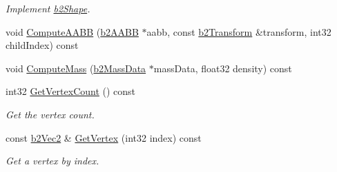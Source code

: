 \begin{DoxyCompactItemize}
\begin{DoxyCompactList}\small\item\em Implement \hyperlink{classb2_shape}{b2\-Shape}. \end{DoxyCompactList}\item 
void \hyperlink{classb2_polygon_shape_a00e225b0321bf6bb231a554036ffdf23}{Compute\-A\-A\-B\-B} (\hyperlink{structb2_a_a_b_b}{b2\-A\-A\-B\-B} $\ast$aabb, const \hyperlink{structb2_transform}{b2\-Transform} \&transform, int32 child\-Index) const 
\item 
void \hyperlink{classb2_polygon_shape_ad86c4c2a83a7122599462da83bf35389}{Compute\-Mass} (\hyperlink{structb2_mass_data}{b2\-Mass\-Data} $\ast$mass\-Data, float32 density) const 
\item 
\hypertarget{classb2_polygon_shape_ae220f24c42eff4aef4cd452676ca2ced}{int32 \hyperlink{classb2_polygon_shape_ae220f24c42eff4aef4cd452676ca2ced}{Get\-Vertex\-Count} () const }\label{classb2_polygon_shape_ae220f24c42eff4aef4cd452676ca2ced}

\begin{DoxyCompactList}\small\item\em Get the vertex count. \end{DoxyCompactList}\item 
\hypertarget{classb2_polygon_shape_a88cdb687ec7dc0cbcf4bd25fd37f4da1}{const \hyperlink{structb2_vec2}{b2\-Vec2} \& \hyperlink{classb2_polygon_shape_a88cdb687ec7dc0cbcf4bd25fd37f4da1}{Get\-Vertex} (int32 index) const }\label{classb2_polygon_shape_a88cdb687ec7dc0cbcf4bd25fd37f4da1}

\begin{DoxyCompactList}\small\item\em Get a vertex by index. \end{DoxyCompactList}\end{DoxyCompactItemize}

